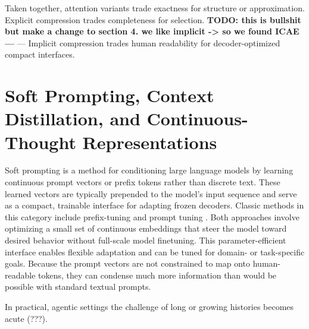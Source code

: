 Taken together, attention variants trade exactness for structure or approximation.
Explicit compression trades completeness for selection.
\textbf{TODO: this is bullshit but make a change to section 4. we like implicit -> so we found ICAE---} --- Implicit compression trades human readability for decoder-optimized compact interfaces.



\section{Soft Prompting, Context Distillation, and Continuous-Thought Representations}

Soft prompting is a method for conditioning large language models by learning continuous prompt vectors or prefix tokens rather than discrete text. 
These learned vectors are typically prepended to the model's input sequence and serve as a compact, trainable interface for adapting frozen decoders.
Classic methods in this category include prefix-tuning \cite{li_prefix_2021} and prompt tuning \cite{lester_prompt_2021}.
Both approaches involve optimizing a small set of continuous embeddings that steer the model toward desired behavior without full-scale model finetuning.
This parameter-efficient interface enables flexible adaptation and can be tuned for domain- or task-specific goals.
Because the prompt vectors are not constrained to map onto human-readable tokens, they can condense much more information than would be possible with standard textual prompts.

In practical, agentic settings the challenge of long or growing histories becomes acute (???).

